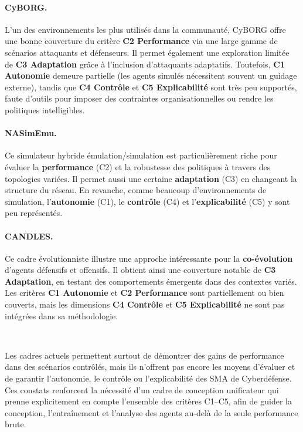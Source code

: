 \paragraph{CyBORG.} L'un des environnements les plus utilisés dans la communauté, CyBORG offre une bonne couverture du critère \textbf{C2 Performance} via une large gamme de scénarios attaquants et défenseurs. Il permet également une exploration limitée de \textbf{C3 Adaptation} grâce à l'inclusion d'attaquants adaptatifs. Toutefois, \textbf{C1 Autonomie} demeure partielle (les agents simulés nécessitent souvent un guidage externe), tandis que \textbf{C4 Contrôle} et \textbf{C5 Explicabilité} sont très peu supportés, faute d'outils pour imposer des contraintes organisationnelles ou rendre les politiques intelligibles.

\paragraph{NASimEmu.} Ce simulateur hybride émulation/simulation est particulièrement riche pour évaluer la \textbf{performance} (C2) et la robustesse des politiques à travers des topologies variées. Il permet aussi une certaine \textbf{adaptation} (C3) en changeant la structure du réseau. En revanche, comme beaucoup d'environnements de simulation, l'\textbf{autonomie} (C1), le \textbf{contrôle} (C4) et l'\textbf{explicabilité} (C5) y sont peu représentés.

\paragraph{CANDLES.} Ce cadre évolutionniste illustre une approche intéressante pour la \textbf{co-évolution} d'agents défensifs et offensifs. Il obtient ainsi une couverture notable de \textbf{C3 Adaptation}, en testant des comportements émergents dans des contextes variés. Les critères \textbf{C1 Autonomie} et \textbf{C2 Performance} sont partiellement ou bien couverts, mais les dimensions \textbf{C4 Contrôle} et \textbf{C5 Explicabilité} ne sont pas intégrées dans sa méthodologie.

\

\noindent Les cadres actuels permettent surtout de démontrer des gains de performance dans des scénarios contrôlés, mais ils n'offrent pas encore les moyens d'évaluer et de garantir l'autonomie, le contrôle ou l'explicabilité des SMA de Cyberdéfense. Ces constats renforcent la nécessité d'un cadre de conception unificateur qui prenne explicitement en compte l'ensemble des critères C1--C5, afin de guider la conception, l'entraînement et l'analyse des agents au-delà de la seule performance brute.

